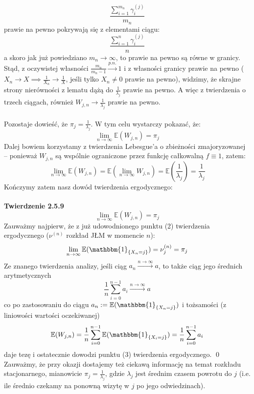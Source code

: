 \documentclass[a4paper]{article}
\begin{document}
$$\frac{\sum\limits_{i=1}^{m_n} \gamma_i^{(j)}}{m_n}$$
prawie na pewno pokrywają się z elementami ciągu:
$$\frac{\sum\limits_{i=1}^{n} \gamma_i^{(j)}}{n}$$
a skoro jak już powiedziano $m_n \to \infty$, to prawie na pewno są równe w granicy.
Stąd, z oczywistej własności $\frac{m_n}{m_n-1} \overset{p.n.}{\to} 1$ i z własności granicy prawie na pewno ($ X_n \to X \implies \frac{1}{X_n} \to \frac{1}{X}$, jeśli tylko $X_n \neq 0$ prawie na pewno), widzimy, że skrajne strony nierówności z lematu dążą do $\frac{1}{\lambda_j}$ prawie na pewno. A więc z twierdzenia o trzech ciągach, również $W_{j,n} \to \frac{1}{\lambda_j}$ prawie na pewno.\\
\\
Pozostaje dowieść, że $\pi_j = \frac{1}{\lambda_j}$. W tym celu wystarczy pokazać, że:
$$ \lim\limits_{n \to \infty} \mathbb{E}(W_{j,n}) = \pi_j$$ Dalej bowiem korzystamy z twierdzenia Lebesgue'a o zbieżności zmajoryzowanej – ponieważ $W_{j,n}$ są wspólnie ograniczone przez funkcję całkowalną $f \equiv 1$, zatem:
$$\lim\limits_{n \to \infty} \mathbb{E}(W_{j,n}) = \mathbb{E}\left( \lim\limits_{n \to \infty} W_{j,n}\right) = \mathbb{E}\left(\frac{1}{\lambda_j}\right) = \frac{1}{\lambda_j}$$
Kończymy zatem nasz dowód twierdzenia ergodycznego:\\\\
\textbf{Twierdzenie 2.5.9}\\
$$\lim\limits_{n \to \infty} \mathbb{E}(W_{j,n}) = \pi_j$$
Zauważmy najpierw, że z już udowodnionego punktu (2) twierdzenia ergodycznego ($\nu^{(n)}$ rozkład JŁM w momencie $n$):
$$\lim\limits_{n \to \infty} \mathbb{E}(\mathbbm{1}_{\{X_n = j\}}) = \nu^{(n)}_j = \pi_j$$
Ze znanego twierdzenia analizy, jeśli ciąg $a_n \xrightarrow{n \to \infty} a$, to także ciąg jego średnich arytmetycznych $$\frac{1}{n}\sum_{i=0}^{n-1} a_i \xrightarrow{n \to \infty} a$$
co po zastosowaniu do ciągu $a_n := \mathbb{E}(\mathbbm{1}_{\{X_n = j\}})$ i tożsamości (z liniowości wartości oczekiwanej)
$$\mathbb{E}(W_{j,n}) = \frac{1}{n} \sum\limits_{i=0}^{n-1} \mathbb{E}(\mathbbm{1}_{\{X_i = j\}}) = \frac{1}{n} \sum\limits_{i=0}^{n-1} a_i$$
daje tezę i ostatecznie dowodzi punktu (3) twierdzenia ergodycznego. \qed
\\
Zauważmy, że przy okazji dostajemy też ciekawą informację na temat rozkładu stacjonarnego, mianowicie $\pi_j = \frac{1}{\lambda_j}$, gdzie $\lambda_j$ jest średnim czasem powrotu do $j$ (i.e. ile średnio czekamy na ponowną wizytę w $j$ po jego odwiedzinach).
\\\\
\end{document}
